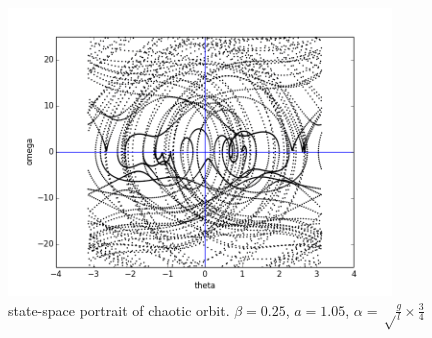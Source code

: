 \documentclass{article}
\begin{document}
\begin{figure}
  \centering
  \includegraphics[height=3in]{figs/Q7/chaos_a105.png}
  \caption{state-space portrait of chaotic orbit. $\beta = 0.25$, $a=1.05$, $\alpha = \sqrt \frac{g}{l} \times \frac{3}{4}$}
  \label{q6}
\end{figure}
\end{document}
